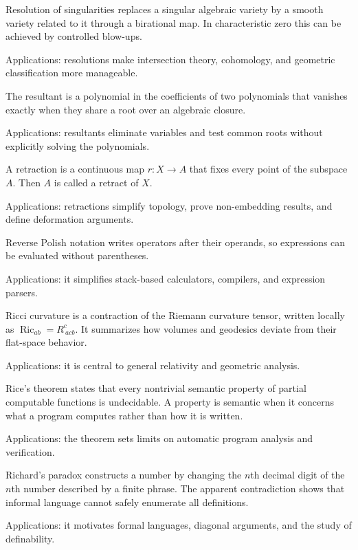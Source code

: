 Resolution of singularities replaces a singular algebraic variety by a smooth variety related to it through a birational map. In characteristic zero this can be achieved by controlled blow-ups. \par\noindent Applications: resolutions make intersection theory, cohomology, and geometric classification more manageable.

The resultant is a polynomial in the coefficients of two polynomials that vanishes exactly when they share a root over an algebraic closure. \par\noindent Applications: resultants eliminate variables and test common roots without explicitly solving the polynomials.

A retraction is a continuous map $r:X\to A$ that fixes every point of the subspace $A$. Then $A$ is called a retract of $X$. \par\noindent Applications: retractions simplify topology, prove non-embedding results, and define deformation arguments.

Reverse Polish notation writes operators after their operands, so expressions can be evaluated without parentheses. \par\noindent Applications: it simplifies stack-based calculators, compilers, and expression parsers.

Ricci curvature is a contraction of the Riemann curvature tensor, written locally as $\operatorname{Ric}_{ab}=R^c_{\ acb}$. It summarizes how volumes and geodesics deviate from their flat-space behavior. \par\noindent Applications: it is central to general relativity and geometric analysis.

Rice's theorem states that every nontrivial semantic property of partial computable functions is undecidable. A property is semantic when it concerns what a program computes rather than how it is written. \par\noindent Applications: the theorem sets limits on automatic program analysis and verification.

Richard's paradox constructs a number by changing the $n$th decimal digit of the $n$th number described by a finite phrase. The apparent contradiction shows that informal language cannot safely enumerate all definitions. \par\noindent Applications: it motivates formal languages, diagonal arguments, and the study of definability.

